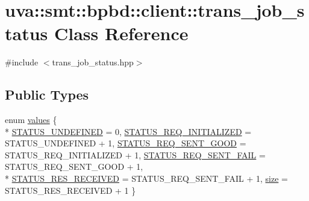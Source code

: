 \hypertarget{classuva_1_1smt_1_1bpbd_1_1client_1_1trans__job__status}{}\section{uva\+:\+:smt\+:\+:bpbd\+:\+:client\+:\+:trans\+\_\+job\+\_\+status Class Reference}
\label{classuva_1_1smt_1_1bpbd_1_1client_1_1trans__job__status}


{\ttfamily \#include $<$trans\+\_\+job\+\_\+status.\+hpp$>$}

\subsection*{Public Types}
\begin{DoxyCompactItemize}
\item 
enum \hyperlink{classuva_1_1smt_1_1bpbd_1_1client_1_1trans__job__status_a80cd5ec4a7e4de9541f48e6b5ccb866d}{values} \{ \\*
\hyperlink{classuva_1_1smt_1_1bpbd_1_1client_1_1trans__job__status_a80cd5ec4a7e4de9541f48e6b5ccb866da403360b08f2de0f31675a6583a1f4ac7}{S\+T\+A\+T\+U\+S\+\_\+\+U\+N\+D\+E\+F\+I\+N\+E\+D} = 0, 
\hyperlink{classuva_1_1smt_1_1bpbd_1_1client_1_1trans__job__status_a80cd5ec4a7e4de9541f48e6b5ccb866dac7a7a8c0315692a0510a941f87ff511e}{S\+T\+A\+T\+U\+S\+\_\+\+R\+E\+Q\+\_\+\+I\+N\+I\+T\+I\+A\+L\+I\+Z\+E\+D} = S\+T\+A\+T\+U\+S\+\_\+\+U\+N\+D\+E\+F\+I\+N\+E\+D + 1, 
\hyperlink{classuva_1_1smt_1_1bpbd_1_1client_1_1trans__job__status_a80cd5ec4a7e4de9541f48e6b5ccb866da5f6d7d1ddb96bb521fb70ccd59412fa1}{S\+T\+A\+T\+U\+S\+\_\+\+R\+E\+Q\+\_\+\+S\+E\+N\+T\+\_\+\+G\+O\+O\+D} = S\+T\+A\+T\+U\+S\+\_\+\+R\+E\+Q\+\_\+\+I\+N\+I\+T\+I\+A\+L\+I\+Z\+E\+D + 1, 
\hyperlink{classuva_1_1smt_1_1bpbd_1_1client_1_1trans__job__status_a80cd5ec4a7e4de9541f48e6b5ccb866da2d39e11101288c3f7ad3532839118b6a}{S\+T\+A\+T\+U\+S\+\_\+\+R\+E\+Q\+\_\+\+S\+E\+N\+T\+\_\+\+F\+A\+I\+L} = S\+T\+A\+T\+U\+S\+\_\+\+R\+E\+Q\+\_\+\+S\+E\+N\+T\+\_\+\+G\+O\+O\+D + 1, 
\\*
\hyperlink{classuva_1_1smt_1_1bpbd_1_1client_1_1trans__job__status_a80cd5ec4a7e4de9541f48e6b5ccb866daa494a5f1d4de362fa250266a1baeafd6}{S\+T\+A\+T\+U\+S\+\_\+\+R\+E\+S\+\_\+\+R\+E\+C\+E\+I\+V\+E\+D} = S\+T\+A\+T\+U\+S\+\_\+\+R\+E\+Q\+\_\+\+S\+E\+N\+T\+\_\+\+F\+A\+I\+L + 1, 
\hyperlink{classuva_1_1smt_1_1bpbd_1_1client_1_1trans__job__status_a80cd5ec4a7e4de9541f48e6b5ccb866dad572a16ae4a34b4eae6bc363065c64a9}{size} = S\+T\+A\+T\+U\+S\+\_\+\+R\+E\+S\+\_\+\+R\+E\+C\+E\+I\+V\+E\+D + 1
 \}
\end{DoxyCompactItemize}
